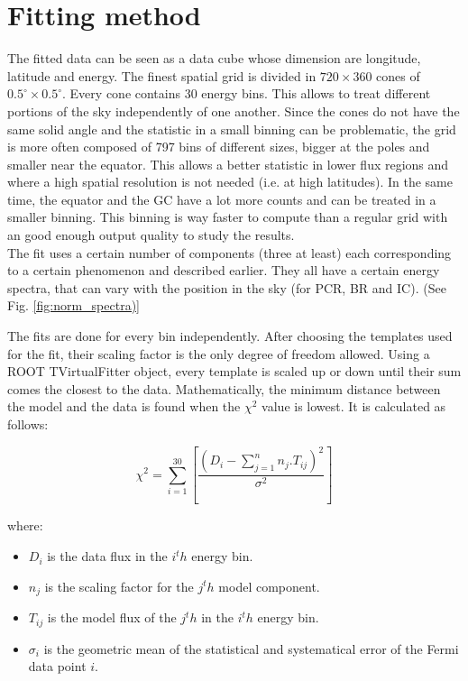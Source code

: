 \section{Fitting method}


The fitted data can be seen as a data cube whose dimension are longitude, latitude and energy. The finest spatial grid is divided in $720 \times 360$ cones of $ 0.5^\circ \times 0.5^\circ $. Every cone contains 30 energy bins. This allows to treat different portions of the sky independently of one another. Since the cones do not have the same solid angle and the statistic in a small binning can be problematic, the grid is more often composed of 797 bins of different sizes, bigger at the poles and smaller near the equator. This allows a better statistic in lower flux regions and where a high spatial resolution is not needed (i.e. at high latitudes). In the same time, the equator and the GC have a lot more counts and can be treated in a smaller binning. This binning is way faster to compute than a regular grid with an good enough output quality to study the results.\\

The fit uses a certain number of components (three at least) each corresponding to a certain phenomenon and described earlier. They all have a certain energy spectra, that can vary with the position in the sky (for PCR, BR and IC). (See Fig. \ref{fig:norm_spectra)}

The fits are done for every bin independently. After choosing the templates used for the fit, their scaling factor is the only degree of freedom allowed. Using a ROOT TVirtualFitter object, every template is scaled up or down until their sum comes the closest to the data. 
Mathematically, the minimum distance between the model and the data is found when the $\chi^2$ value is lowest. It is calculated as follows:

\begin{equation}
\chi^2 = \sum_{i=1}^{30}[\frac{(D_i - \sum_{j=1}^{n}n_j.T_{ij})^2}{\sigma^2}]
\end{equation}

where:
\begin{itemize}
\item $D_i$ is the data flux in the $i^th$ energy bin.
\item $n_j$ is the scaling factor for the $j^th$ model component.
\item $T_{ij}$ is the model flux of the $j^th$ in the $i^th$ energy bin.
\item $\sigma_i$ is the geometric mean of the statistical and systematical error of the Fermi data point $i$.
\end{itemize}

